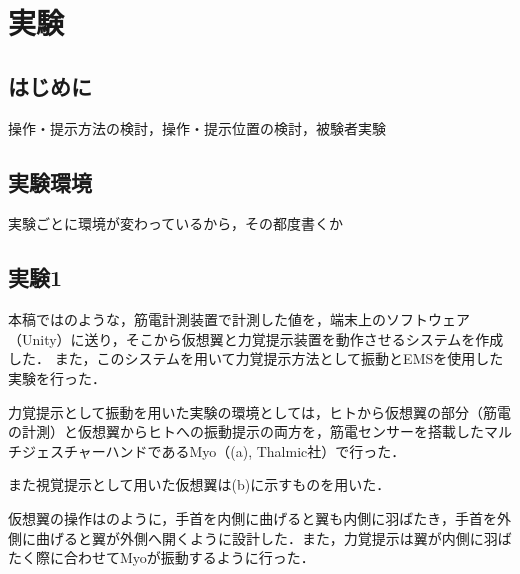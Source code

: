 \chapter[実験]%
        {実験}

\section{はじめに}
    操作・提示方法の検討，操作・提示位置の検討，被験者実験

\section{実験環境}
実験ごとに環境が変わっているから，その都度書くか

\section{実験1}
    本稿ではのような，筋電計測装置で計測した値を，端末上のソフトウェア（Unity）に送り，そこから仮想翼と力覚提示装置を動作させるシステムを作成した．
    また，このシステムを用いて力覚提示方法として振動とEMSを使用した実験を行った．





    力覚提示として振動を用いた実験の環境としては，ヒトから仮想翼の部分（筋電の計測）と仮想翼からヒトへの振動提示の両方を，筋電センサーを搭載したマルチジェスチャーハンドであるMyo（(a), Thalmic社）で行った．

    また視覚提示として用いた仮想翼は(b)に示すものを用いた．

    仮想翼の操作はのように，手首を内側に曲げると翼も内側に羽ばたき，手首を外側に曲げると翼が外側へ開くように設計した．また，力覚提示は翼が内側に羽ばたく際に合わせてMyoが振動するように行った．

